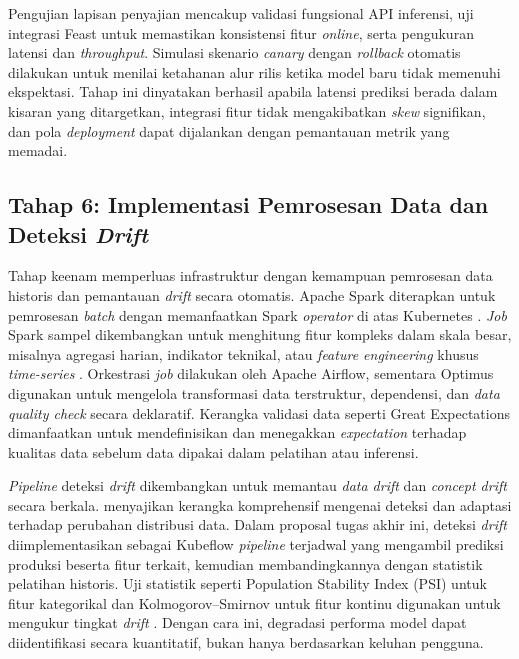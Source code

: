 Pengujian lapisan penyajian mencakup validasi fungsional API inferensi, uji integrasi Feast untuk memastikan konsistensi fitur \textit{online}, serta pengukuran latensi dan \textit{throughput}. Simulasi skenario \textit{canary} dengan \textit{rollback} otomatis dilakukan untuk menilai ketahanan alur rilis ketika model baru tidak memenuhi ekspektasi. Tahap ini dinyatakan berhasil apabila latensi prediksi berada dalam kisaran yang ditargetkan, integrasi fitur tidak mengakibatkan \textit{skew} signifikan, dan pola \textit{deployment} dapat dijalankan dengan pemantauan metrik yang memadai.

\subsection{Tahap 6: Implementasi Pemrosesan Data dan Deteksi \textit{Drift}}

Tahap keenam memperluas infrastruktur dengan kemampuan pemrosesan data historis dan pemantauan \textit{drift} secara otomatis. Apache Spark diterapkan untuk pemrosesan \textit{batch} dengan memanfaatkan Spark \textit{operator} di atas Kubernetes \parencite{apachespark2024}. \textit{Job} Spark sampel dikembangkan untuk menghitung fitur kompleks dalam skala besar, misalnya agregasi harian, indikator teknikal, atau \textit{feature engineering} khusus \textit{time-series} \parencite{zaharia2016spark}. Orkestrasi \textit{job} dilakukan oleh Apache Airflow, sementara Optimus digunakan untuk mengelola transformasi data terstruktur, dependensi, dan \textit{data quality check} secara deklaratif. Kerangka validasi data seperti Great Expectations dimanfaatkan untuk mendefinisikan dan menegakkan \textit{expectation} terhadap kualitas data sebelum data dipakai dalam pelatihan atau inferensi.

\textit{Pipeline} deteksi \textit{drift} dikembangkan untuk memantau \textit{data drift} dan \textit{concept drift} secara berkala. \textcite{lu2019learning} menyajikan kerangka komprehensif mengenai deteksi dan adaptasi terhadap perubahan distribusi data. Dalam proposal tugas akhir ini, deteksi \textit{drift} diimplementasikan sebagai Kubeflow \textit{pipeline} terjadwal yang mengambil prediksi produksi beserta fitur terkait, kemudian membandingkannya dengan statistik pelatihan historis. Uji statistik seperti Population Stability Index (PSI) untuk fitur kategorikal dan Kolmogorov--Smirnov untuk fitur kontinu digunakan untuk mengukur tingkat \textit{drift} \parencite{bayram2022concept,cespedes2024efficient}. Dengan cara ini, degradasi performa model dapat diidentifikasi secara kuantitatif, bukan hanya berdasarkan keluhan pengguna.

